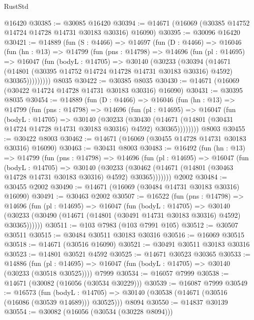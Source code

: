 \begin{lexlean}{RustStd}
\begin{coremodule}
    @16420
@30385 := @30085 @16420
@30394 := @14671 (@16069 (@30385 @14752 @14724 @14728 @14731 @30183 @30316) @16090)
@30395 := @30096 @16420
@30421 := @14889
    (fun (S : @4466) =>
    @14697
      (fun (D : @4466) =>
      @16046
        (fun (hn : @13) =>
        @14799
          (fun (pns : @14798) =>
          @14696
            (fun (pl : @14695) =>
            @16047
              (fun (bodyL : @14705) =>
              @30140
                (@30233
                  (@30394
                    (@14671
                      (@14801 (@30395 @14752 @14724 @14728 @14731 @30183 @30316) @4592)
                      @30365)))))))))
    @8035
@30422 := @30385 @8035
@30430 := @14671 (@16069 (@30422 @14724 @14728 @14731 @30183 @30316) @16090)
@30431 := @30395 @8035
@30454 := @14889
    (fun (D : @4466) =>
    @16046
      (fun (hn : @13) =>
      @14799
        (fun (pns : @14798) =>
        @14696
          (fun (pl : @14695) =>
          @16047
            (fun (bodyL : @14705) =>
            @30140
              (@30233
                (@30430
                  (@14671 (@14801 (@30431 @14724 @14728 @14731 @30183 @30316) @4592) @30365))))))))
    @8003
@30455 := @30422 @8003
@30462 := @14671 (@16069 (@30455 @14728 @14731 @30183 @30316) @16090)
@30463 := @30431 @8003
@30483 := @16492
    (fun (hn : @13) =>
    @14799
      (fun (pns : @14798) =>
      @14696
        (fun (pl : @14695) =>
        @16047
          (fun (bodyL : @14705) =>
          @30140
            (@30233
              (@30462 (@14671 (@14801 (@30463 @14728 @14731 @30183 @30316) @4592) @30365)))))))
    @2002
@30484 := @30455 @2002
@30490 := @14671 (@16069 (@30484 @14731 @30183 @30316) @16090)
@30491 := @30463 @2002
@30507 := @16522
    (fun (pns : @14798) =>
    @14696
      (fun (pl : @14695) =>
      @16047
        (fun (bodyL : @14705) =>
        @30140 (@30233 (@30490 (@14671 (@14801 (@30491 @14731 @30183 @30316) @4592) @30365))))))
@30511 := @103 @7983 (@103 @7991 @105)
@30512 := @30507 @30511
@30515 := @30484 @30511 @30183 @30316
@30516 := @16069 @30515
@30518 := @14671 (@30516 @16090)
@30521 := @30491 @30511 @30183 @30316
@30523 := @14801 @30521 @4592
@30525 := @14671 @30523 @30365
@30533 := @14886
    (fun (pl : @14695) => @16047 (fun (bodyL : @14705) => @30140 (@30233 (@30518 @30525))))
    @7999
@30534 := @16057 @7999
@30538 := @14671 (@30082 (@16056 (@30534 @30229)))
@30539 := @16087 @7999
@30549 := @16573
    (fun (bodyL : @14705) => @30140 (@30538 (@14671 (@30516 (@16086 (@30539 @14689))) @30525)))
    @8094
@30550 := @14837 @30139
@30554 := @30082 (@16056 (@30534 (@30228 @8094)))

\end{coremodule}
\end{lexlean}
